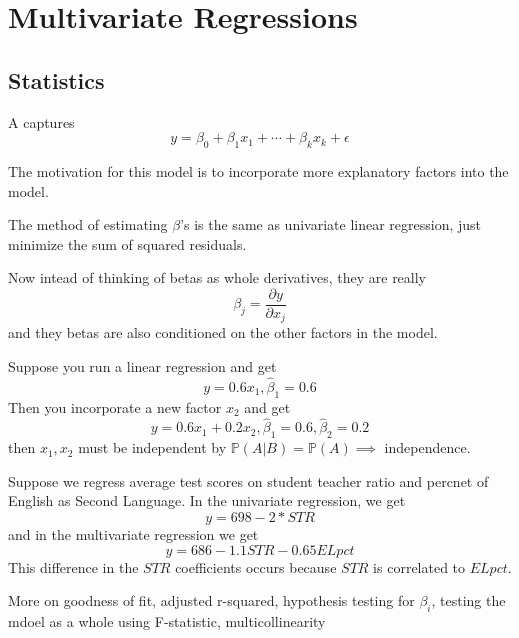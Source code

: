 \documentclass[12pt]{scrartcl}
\newcommand{\PP}{\mathbb{P}}
\begin{document}
\section{Multivariate Regressions}

\subsection{Statistics}

\begin{definition}
  A  captures
  \[y = \beta_0 + \beta_1 x_1 + \cdots + \beta_k x_k + \epsilon\]

  The motivation for this model is to incorporate more explanatory factors
  into the model.
\end{definition}

\begin{note}
  The method of estimating $\beta$'s is the same as univariate linear regression, just minimize the 
  sum of squared residuals.
\end{note}

\begin{note}
  Now intead of thinking of betas as whole derivatives, they are really
  \[\beta_j = \frac{\partial y}{\partial x_j}\] and 
  they betas are also conditioned on the other factors in the model. 
\end{note}

\begin{example}
  Suppose you run a linear regression and get 
  \[y = 0.6x_1, \hat{\beta}_1 = 0.6\]
  Then you incorporate a new factor $x_2$ and get 
  \[y = 0.6x_1 + 0.2x_2, \hat{\beta}_1 = 0.6, \hat{\beta}_2 = 0.2\]
  then $x_1, x_2$ must be independent by $\PP(A|B) = \PP(A) \implies$ independence.
\end{example}

\begin{example}
  Suppose we regress average test scores on student teacher ratio and 
  percnet of English as Second Language. In the univariate regression, 
  we get 
  \[y = 698 - 2 * STR\]
  and in the multivariate regression we get 
  \[y = 686 - 1.1 STR - 0.65 ELpct\]
  This difference in the $STR$ coefficients occurs because 
  $STR$ is correlated to $ELpct$. 
\end{example}

More on goodness of fit, adjusted r-squared, hypothesis testing for $\beta_i$, testing the 
mdoel as a whole using F-statistic, multicollinearity
\end{document}

